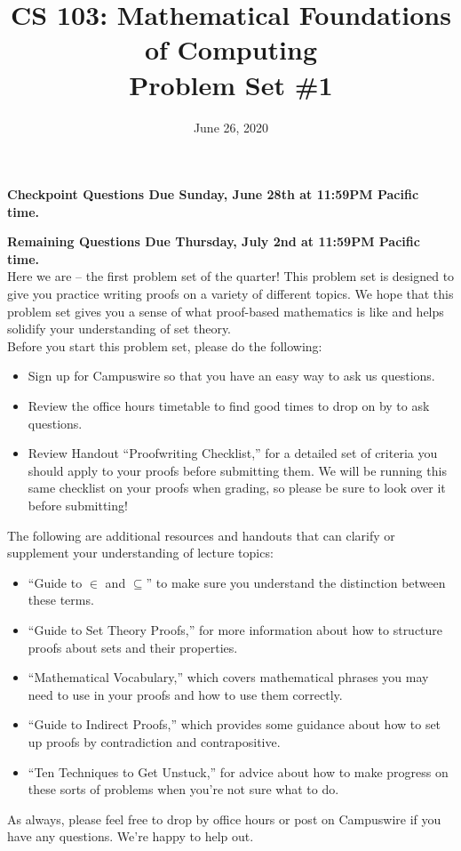 \documentclass{article}
\title{CS 103: Mathematical Foundations of Computing\\Problem Set \#1}
\author{}
\date{June 26, 2020}
\renewcommand{\(}{\left(}
\renewcommand{\)}{\right)}
\theoremstyle{plain}
\theoremstyle{plain}
\theoremstyle{definition}
\begin{document}
\maketitle

\textbf{Checkpoint Questions Due Sunday, June 28th at 11:59PM Pacific time.}

\textbf{Remaining Questions Due Thursday, July 2nd at 11:59PM Pacific time.} \\

Here we are -- the first problem set of the quarter! This problem set is designed to give you practice writing proofs on a variety of different topics. We hope that this problem set gives you a sense of what proof-based mathematics is like and helps solidify your understanding of set theory. \\

Before you start this problem set, please do the following:
\begin{itemize}
	\item Sign up for Campuswire so that you have an easy way to ask us questions.
 	\item Review the office hours timetable to find good times to drop on by to ask questions.
	\item Review Handout ``Proofwriting Checklist,'' for a detailed set of criteria you should apply to your proofs before submitting them. We will be running this same checklist on your proofs when grading, so please be sure to look over it before submitting!
\end{itemize}
The following are additional resources and handouts that can clarify or supplement your understanding of lecture topics:
\begin{itemize}
	\item ``Guide to $\in$ and $\subseteq$'' to make sure you understand the distinction between these terms.
    	\item ``Guide to Set Theory Proofs,'' for more information about how to structure proofs about sets and their properties.
    	\item ``Mathematical Vocabulary,'' which covers mathematical phrases you may need to use in your proofs and how to use them correctly.
    	\item ``Guide to Indirect Proofs,'' which provides some guidance about how to set up proofs by contradiction and contrapositive.
    	\item ``Ten Techniques to Get Unstuck,'' for advice about how to make progress on these sorts of problems when you're not sure what to do.
\end{itemize}
As always, please feel free to drop by office hours or post on Campuswire if you have any questions. We're happy to help out. \\
\end{document}
